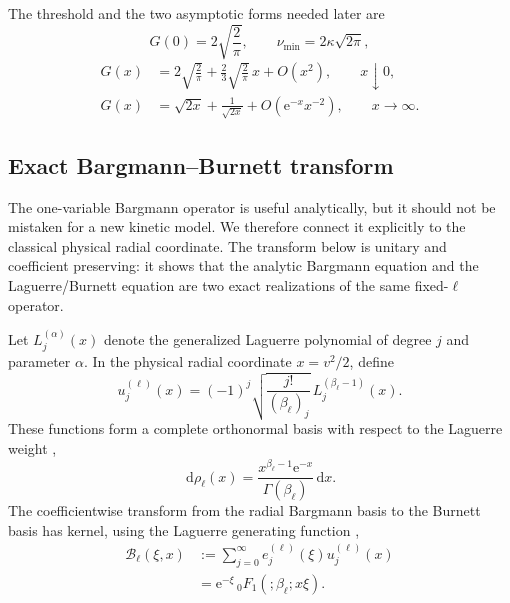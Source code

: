 \documentclass[11pt]{article}
\numberwithin{equation}{section}
\newcommand{\dd}{\,\mathrm d}
\newcommand{\e}{\mathrm e}
\theoremstyle{definition}
\begin{document}
The threshold and the two asymptotic forms needed later are
\begin{equation}
 G(0)=2\sqrt{\frac2\pi},
 \qquad
 \nu_{\min}=2\kappa\sqrt{2\pi},
 \label{eq:numin}
\end{equation}
\begin{align}
 G(x)
 &=2\sqrt{\frac2\pi}
 +\frac23\sqrt{\frac2\pi}\,x+O(x^2),
 \qquad x\downarrow0,
 \label{eq:Gsmall}
 \\
 G(x)
 &=\sqrt{2x}+\frac1{\sqrt{2x}}
 +O(\e^{-x}x^{-2}),
 \qquad x\to\infty.
 \label{eq:Glarge}
\end{align}

\subsection{Exact Bargmann--Burnett transform}

The one-variable Bargmann operator is useful analytically, but it should not
be mistaken for a new kinetic model.  We therefore connect it explicitly to
the classical physical radial coordinate.  The transform below is unitary and
coefficient preserving: it shows that the analytic Bargmann equation and the
Laguerre/Burnett equation are two exact realizations of the same fixed-$\ell$
operator.

Let $L_j^{(\alpha)}(x)$ denote the generalized Laguerre polynomial of degree
$j$ and parameter $\alpha$.  In the physical radial coordinate $x=v^2/2$,
define
\begin{equation}
 u_j^{(\ell)}(x)
 =
 (-1)^j
 \sqrt{\frac{j!}{(\beta_\ell)_j}}\,
 L_j^{(\beta_\ell-1)}(x).
 \label{eq:burnett_radial}
\end{equation}
These functions form a complete orthonormal basis with respect to the
Laguerre weight \cite{Chihara1978,NIST2010},
\begin{equation}
 \dd\rho_\ell(x)
 =
 \frac{x^{\beta_\ell-1}\e^{-x}}{\Gamma(\beta_\ell)}\dd x.
 \label{eq:rho}
\end{equation}
The coefficientwise transform from the radial Bargmann basis to the Burnett
basis has kernel, using the Laguerre generating function \cite{NIST2010},
\begin{equation}
 \begin{aligned}
 \mathscr B_\ell(\xi,x)
 &:=
 \sum_{j=0}^\infty
 e_j^{(\ell)}(\xi)u_j^{(\ell)}(x)
 \\
 &=
 \boxed{
 \e^{-\xi}\,
 {}_0F_1(; \beta_\ell;x\xi)
 }.
 \end{aligned}
 \label{eq:Bkernel}
\end{equation}
\end{document}
